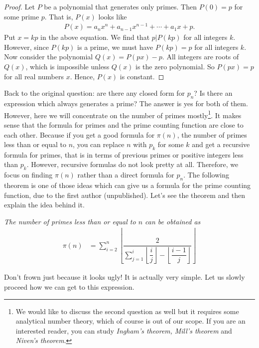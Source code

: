 \documentclass{subfiles}
\begin{document}
	\begin{proof}
		Let $P$ be a polynomial that generates only primes. Then $P(0)=p$ for some prime $p$. That is, $P(x)$ looks like
		\begin{align*}
			P(x)=a_nx^n+a_{n-1}x^{n-1} + \cdots + a_1x + p.
		\end{align*}
		Put $x=kp$ in the above equation. We find that $p|P(kp)$ for all integers $k$. However, since $P(kp)$ is a prime, we must have $P(kp)=p$ for all integers $k$. Now consider the polynomial $Q(x)=P(px)-p$. All integers are roots of $Q(x)$, which is impossible unless $Q(x)$ is the zero polynomial. So $P(px)=p$ for all real numbers $x$. Hence, $P(x)$ is constant.
	\end{proof}
	Back to the original question: are there any closed form for $p_n$? Is there an expression which always generates a prime? The answer is yes for both of them. However, here we will concentrate on the number of primes mostly\footnote{We would like to discuss the second question as well but it requires some analytical number theory, which of course is out of our scope. If you are an interested reader, you can study \textit{Ingham's theorem,}\cite{ingham} \textit{Mill's theorem}\cite{mills} and \textit{Niven's theorem}\cite{niven}.}. It makes sense that the formula for primes and the prime counting function are close to each other. Because if you get a good formula for $\pi(n)$, the number of primes less than or equal to $n$, you can replace $n$ with $p_k$ for some $k$ and get a recursive formula for primes, that is in terms of previous primes or positive integers less than $p_k$. However, recursive formulas do not look pretty at all. Therefore, we focus on finding $\pi(n)$ rather than a direct formula for $p_n$. The following theorem is one of those ideas which can give us a formula for the prime counting function, due to the first author (unpublished). Let's see the theorem and then explain the idea behind it.
	\begin{theorem}\slshape
		The number of primes less than or equal to $n$ can be obtained as
		\begin{align*}
			\pi(n) & = 
			\sum_{i=2}^{n}\left\lfloor\dfrac{2}{\sum_{j=1}^{i}\left\lfloor\dfrac{i}{j}\right\rfloor-\left\lfloor\dfrac{i-1}{j}\right\rfloor}\right\rfloor
		\end{align*}
	\end{theorem}
	Don't frown just because it looks ugly! It is actually very simple. Let us slowly proceed how we can get to this expression. 
\end{document}
